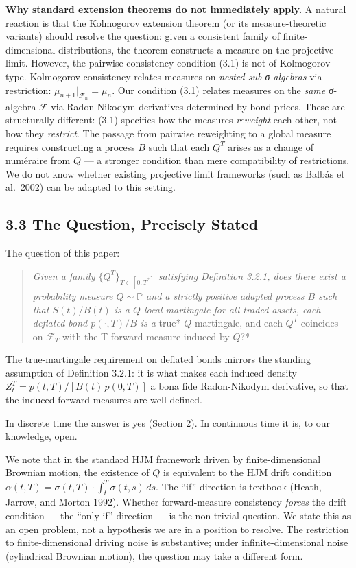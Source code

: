 \documentclass[
]{article}
\begin{document}
\textbf{Why standard extension theorems do not immediately apply.} A
natural reaction is that the Kolmogorov extension theorem (or its
measure-theoretic variants) should resolve the question: given a
consistent family of finite-dimensional distributions, the theorem
constructs a measure on the projective limit. However, the pairwise
consistency condition (3.1) is not of Kolmogorov type. Kolmogorov
consistency relates measures on \emph{nested sub-σ-algebras} via
restriction: \(\mu_{n+1}|_{\mathcal{F}_n} = \mu_n\). Our condition (3.1)
relates measures on the \emph{same} σ-algebra \(\mathcal{F}\) via
Radon-Nikodym derivatives determined by bond prices. These are
structurally different: (3.1) specifies how the measures \emph{reweight}
each other, not how they \emph{restrict}. The passage from pairwise
reweighting to a global measure requires constructing a process \(B\)
such that each \(Q^T\) arises as a change of numéraire from \(Q\) --- a
stronger condition than mere compatibility of restrictions. We do not
know whether existing projective limit frameworks (such as Balbás et
al.~2002) can be adapted to this setting.

\subsection{3.3 The Question, Precisely
Stated}\label{the-question-precisely-stated}

The question of this paper:

\begin{quote}
\emph{Given a family \(\{Q^T\}_{T \in [0,T^*]}\) satisfying Definition
3.2.1, does there exist a probability measure \(Q \sim \mathbb{P}\) and
a strictly positive adapted process \(B\) such that \(S(t)/B(t)\) is a
\(Q\)-local martingale for all traded assets, each deflated bond
\(p(\cdot,T)/B\) is a }true* \(Q\)-martingale, and each \(Q^T\)
coincides on \(\mathcal{F}_T\) with the T-forward measure induced by
\(Q\)?*
\end{quote}

The true-martingale requirement on deflated bonds mirrors the standing
assumption of Definition 3.2.1: it is what makes each induced density
\(Z^T_t = p(t,T)/[B(t)\,p(0,T)]\) a bona fide Radon-Nikodym derivative,
so that the induced forward measures are well-defined.

In discrete time the answer is yes (Section 2). In continuous time it
is, to our knowledge, open.

We note that in the standard HJM framework driven by finite-dimensional
Brownian motion, the existence of \(Q\) is equivalent to the HJM drift
condition
\(\alpha(t,T) = \sigma(t,T) \cdot \int_t^T \sigma(t,s) \, ds\). The
``if'' direction is textbook (Heath, Jarrow, and Morton 1992). Whether
forward-measure consistency \emph{forces} the drift condition --- the
``only if'' direction --- is the non-trivial question. We state this as
an open problem, not a hypothesis we are in a position to resolve. The
restriction to finite-dimensional driving noise is substantive; under
infinite-dimensional noise (cylindrical Brownian motion), the question
may take a different form.
\end{document}
